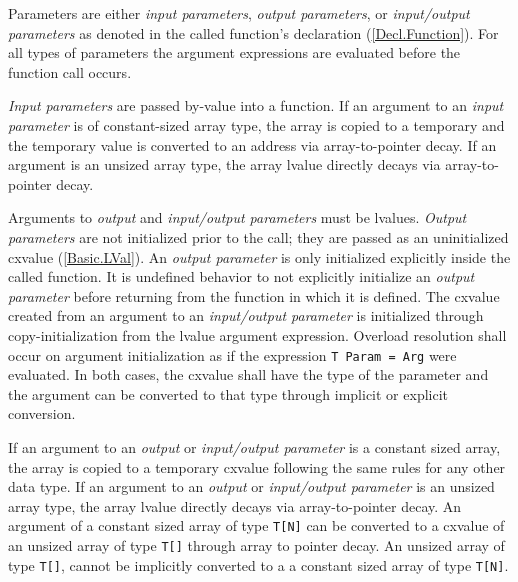 \p Parameters are either \textit{input parameters}, \textit{output parameters},
or \textit{input/output parameters} as denoted in the called function's
declaration (\ref{Decl.Function}). For all types of parameters the argument
expressions are evaluated before the function call occurs.

\p \textit{Input parameters} are passed by-value into a function. If an argument
to an \textit{input parameter} is of constant-sized array type, the array is
copied to a temporary and the temporary value is converted to an address via
array-to-pointer decay. If an argument is an unsized array type, the array
lvalue directly decays via array-to-pointer decay.


\p Arguments to \textit{output} and \textit{input/output parameters} must be
lvalues. \textit{Output parameters} are not initialized prior to the call; they
are passed as an uninitialized cxvalue (\ref{Basic.LVal}). An \textit{output
parameter} is only initialized explicitly inside the called function. It is
undefined behavior to not explicitly initialize an \textit{output parameter}
before returning from the function in which it is defined. The cxvalue created
from an argument to an \textit{input/output parameter} is initialized through
copy-initialization from the lvalue argument expression. Overload resolution
shall occur on argument initialization as if the expression \texttt{T Param =
Arg} were evaluated. In both cases, the cxvalue shall have the type of the
parameter and the argument can be converted to that type through implicit or
explicit conversion.

\p If an argument to an \textit{output} or \textit{input/output parameter} is a
constant sized array, the array is copied to a temporary cxvalue following the
same rules for any other data type. If an argument to an \textit{output} or
\textit{input/output parameter} is an unsized array type, the array lvalue
directly decays via array-to-pointer decay. An argument of a constant sized
array of type \texttt{T[N]} can be converted to a cxvalue of an unsized array
of type \texttt{T[]} through array to pointer decay. An unsized array of type
\texttt{T[]}, cannot be implicitly converted to a a constant sized array of type
\texttt{T[N]}.


